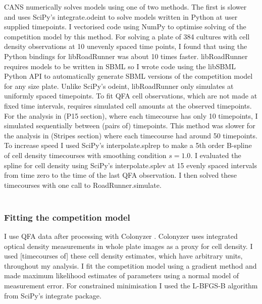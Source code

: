 CANS numerically solves models using one of two methods. The first is
slower and uses SciPy's integrate.odeint to solve models written in
Python at user supplied timepoints. I vectorised code using NumPy to
optimise solving of the competition model by this method. For solving
a plate of 384 cultures with cell density observations at 10 unevenly
spaced time points, I found that using the Python bindings for
libRoadRunner was about 10 times faster. libRoadRunner requires models
to be written in SBML so I wrote code using the libSBML Python API to
automatically generate SBML versions of the competition model for any
size plate.
Unlike SciPy's odeint, libRoadRunner only simulates at uniformly
spaced timepoints. To fit QFA cell observations, which are not made at
fixed time intervals, requires simulated cell amounts at the observed
timepoints. For the analysis in (P15 section), where each timecourse
has only 10 timepoints, I simulated sequentially between (pairs of)
timepoints. This method was slower for the analysis in (Stripes
section) where each timecourse had around 50 timepoints. To increase
speed I used SciPy's interpolate.splrep to make a 5th order B-spline
of cell density timecourses with smoothing condition \(s=1.0\). I
evaluated the spline for cell density using SciPy's interpolate.splev
at 15 evenly spaced intervals from time zero to the time of the last
QFA observation. I then solved these
timecourses with one call to RoadRunner.simulate.\\\\

\subsubsection{Fitting the competition model}
\label{sec:fitting_comp}

I use QFA data after processing with Colonyzer \citep{Lawless2010}.
Colonyzer uses integrated optical density measurements in whole plate
images as a proxy for cell density. I used [timecourses of] these cell
density estimates, which have arbitrary units, throughout my
analysis. I fit the competition model using a gradient method and made
maximum likelihood estimates of parameters using a normal model of
measurement error. For constrained minimisation I used the L-BFGS-B
algorithm from SciPy's integrate package.

